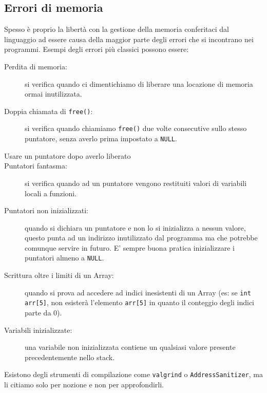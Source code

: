 \documentclass[12pt]{report}
\begin{document}
	\subsection{Errori di memoria}
	Spesso è proprio la libertà con la gestione della memoria conferitaci dal linguaggio ad essere causa della maggior parte degli errori che si incontrano nei programmi.
	Esempi degli errori più classici possono essere:
	\begin{description}
		\item[Perdita di memoria:] si verifica quando ci dimentichiamo di liberare una locazione di memoria ormai inutilizzata.
		
		\item[Doppia chiamata di \texttt{free()}:] si verifica quando chiamiamo \texttt{free()} due volte consecutive sullo stesso puntatore, senza averlo prima impostato a \texttt{NULL}.
		
		\item[Usare un puntatore dopo averlo liberato]
		
		\item [Puntatori fantasma:] si verifica quando ad un puntatore vengono restituiti valori di variabili locali a funzioni.
		
		\item[Puntatori non inizializzati:] quando si dichiara un puntatore e non lo si inizializza a nessun valore, questo punta ad un indirizzo inutilizzato dal programma ma che potrebbe comunque servire in futuro. E' sempre buona pratica inizializzare i puntatori almeno a \texttt{NULL}.
		
		\item[Scrittura oltre i limiti di un Array:] quando si prova ad accedere ad indici inesistenti di un Array (es: se \texttt{int arr[5]}, non esisterà l'elemento \texttt{arr[5]} in quanto il conteggio degli indici parte da 0).
		
		\item[Variabili inizializzate:] una variabile non inizializzata contiene un qualsiasi valore presente precedentemente nello stack.
		
	\end{description}
	
	Esistono degli strumenti di compilazione come \texttt{valgrind} o \texttt{AddressSanitizer}, ma li citiamo solo per nozione e non per approfondirli.
	
\end{document}
